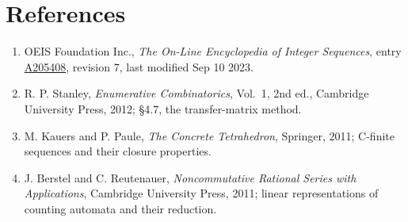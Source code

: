 \documentclass[11pt]{article}
\theoremstyle{definition}
\begin{document}
\section{References}

\begin{enumerate}

\item OEIS Foundation Inc., \emph{The On-Line Encyclopedia of Integer Sequences}, entry \href{https://oeis.org/A205408}{A205408}, revision 7, last modified Sep 10 2023.

\item R. P. Stanley, \emph{Enumerative Combinatorics}, Vol.~1, 2nd ed., Cambridge University Press, 2012; \S4.7, the transfer-matrix method.

\item M. Kauers and P. Paule, \emph{The Concrete Tetrahedron}, Springer, 2011; C-finite sequences and their closure properties.

\item J. Berstel and C. Reutenauer, \emph{Noncommutative Rational Series with Applications}, Cambridge University Press, 2011; linear representations of counting automata and their reduction.

\end{enumerate}
\end{document}
